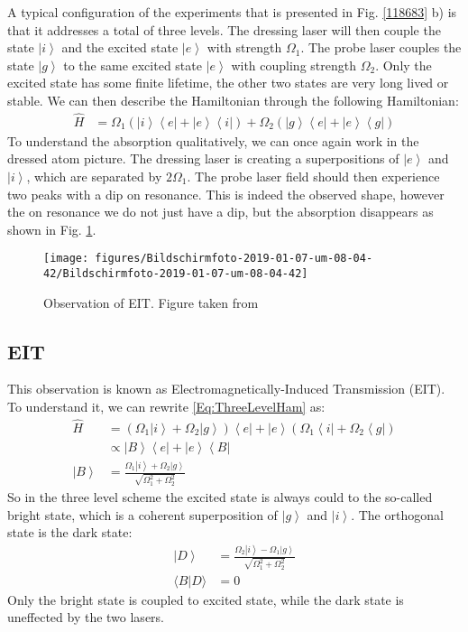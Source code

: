 \documentclass[10pt]{article}
\let\cite\citep
\providecommand\citep{\cite}
\newcommand{\bra}[1]{\ensuremath{\left\langle#1\right|}}
\newcommand{\ket}[1]{\ensuremath{\left|#1\right\rangle}}
\begin{document}
A typical configuration of the experiments that is presented in Fig. \ref{118683} b) is that it addresses a total of three levels. The dressing laser will then couple the state $\ket{i}$ and the excited state $\ket{e}$ with strength $\Omega_1$. The probe laser couples the state $\ket{g}$ to the same excited state $\ket{e}$ with coupling strength $\Omega_2$.  Only the excited state has some finite lifetime, the other two states are very long lived or stable. 
We can then describe the Hamiltonian through the following Hamiltonian:
\begin{align}\label{Eq:ThreeLevelHam}
\hat{H}&= \Omega_1\left(\ket{i}\bra{e}+\ket{e}\bra{i}\right)+\Omega_2\left(\ket{g}\bra{e}+\ket{e}\bra{g}\right)
\end{align}
To understand the absorption qualitatively, we can once again work in the dressed atom picture. The dressing laser is creating a superpositions of $\ket{e}$ and $\ket{i}$, which are separated by $2\Omega_1$. The probe laser field should then experience two peaks with a dip on resonance. This is indeed the observed shape, however the on resonance we do not just have a dip, but the absorption  disappears as shown in Fig. \ref{893938}.
\begin{figure}[h!]
\begin{center}
\texttt{[image: figures/Bildschirmfoto-2019-01-07-um-08-04-42/Bildschirmfoto-2019-01-07-um-08-04-42]}
\caption{{Observation of EIT. Figure taken from \protect\cite{Boller_1991}
{\label{893938}}%
}}
\end{center}
\end{figure}

\subsection{EIT}
This observation is known as Electromagnetically-Induced Transmission (EIT). To understand it, we can rewrite \eqref{Eq:ThreeLevelHam} as:
\begin{align}
\hat{H}&= (\Omega_1\ket{i}+\Omega_2\ket{g})\bra{e}+\ket{e}(\Omega_1\bra{i}+\Omega_2\bra{g})\\
&\propto\ket{B}\bra{e}+\ket{e}\bra{B}\\
\ket{B}&= \frac{\Omega_1\ket{i}+\Omega_2\ket{g}}{\sqrt{\Omega_1^2+\Omega_2^2}}
\end{align}
So in the three level scheme the excited state is always could to the so-called bright state, which is a coherent superposition of $\ket{g}$ and $\ket{i}$. The orthogonal state is the dark state:
\begin{align}
\ket{D}&= \frac{\Omega_2\ket{i}-\Omega_1\ket{g}}{\sqrt{\Omega_1^2+\Omega_2^2}}\\
\langle B| D\rangle &= 0
\end{align}
Only the bright state is coupled to excited state, while the dark state is uneffected by the two lasers.
\end{document}
